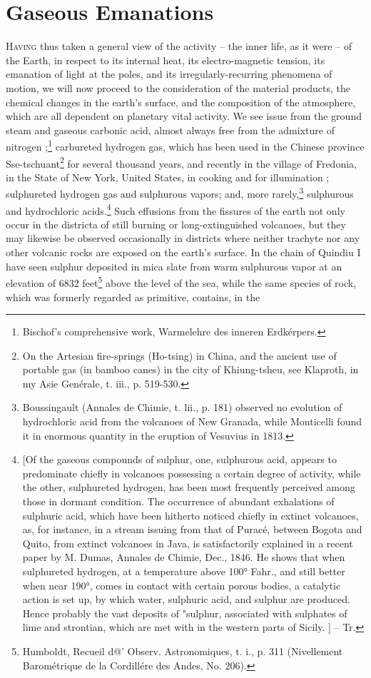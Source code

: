 
\chapter{Gaseous Emanations}

\lettrine[lines=4]{\goudy H}{aving} thus taken a general view of the activity -- the inner life, as it were -- of the Earth, in respect to its internal heat, its electro-magnetic tension, its emanation of light at the poles, and its irregularly-recurring phenomena of motion, we will now proceed to the consideration of the material products, the chemical changes in the earth’s surface, and the composition of the atmosphere, which are all dependent on planetary vital activity. We see issue from the ground steam and gaseous carbonic acid, almost always free from the admixture of nitrogen ;\footnote{Bischof's comprehensive work, Warmelehre des inneren Erdkérpers.} carbureted hydrogen gas, which has been used in the Chinese province Sse-tschuant\footnote{On the Artesian fire-springs (Ho-tsing) in China, and the ancient use of portable gas (in bamboo canes) in the city of Khiung-tsheu, see Klaproth, in my Asie Genérale, t. iii., p. 519-530.} for several thousand years, and recently in the village of Fredonia, in the State of New York, United States, in cooking and for illumination ; sulphureted hydrogen gas and sulphurous vapors; and, more rarely,\footnote{Boussingault (Annales de Chimie, t. lii., p. 181) observed no evolution of hydrochloric acid from the volcanoes of New Granada, while Monticelli found it in enormous quantity in the eruption of Vesuvius in 1813.} sulphurous and hydrochloric acids.\footnote{[Of the gaseous compounds of sulphur, one, sulphurous acid, appears to predominate chiefly in volcanoes possessing a certain degree of activity, while the other, sulphureted hydrogen, has been most frequently perceived among those in dormant condition. The occurrence of abundant exhalations of sulphuric acid, which have been hitherto noticed chiefly in extinct volcanoes, as, for instance, in a stream issuing from that of Puracé, between Bogota and Quito, from extinct volcanoes in Java, is satisfactorily explained in a recent paper by M. Dumas, Annales de Chimie, Dec., 1846. He shows that when sulphureted hydrogen, at a temperature above 100° Fahr., and still better when near 190°, comes in contact with certain porous bodies, a catalytic action is set up, by which water, sulphuric acid, and sulphur are produced. Hence probably the vast deposits of "sulphur, associated with sulphates of lime and strontian, which are met with in the western parts of Sicily. ] -- Tr.} Such effusions from the fissures of the earth not only occur in the districta of still burning or long-extinguished volcanoes, but they may likewise be observed occasionally in districts where neither trachyte nor any other volcanic rocks are exposed on the earth’s surface. In the chain of Quindiu I have seen sulphur deposited in mica slate from warm sulphurous vapor at an elevation of 6832 feet\footnote{Humboldt, Recueil d@’ Observ. Astronomiques, t. i., p. 311 (Nivellement Barométrique de la Cordillére des Andes, No. 206).} above the level of the sea, while the same species of rock, which was formerly regarded as primitive, contains, in the 